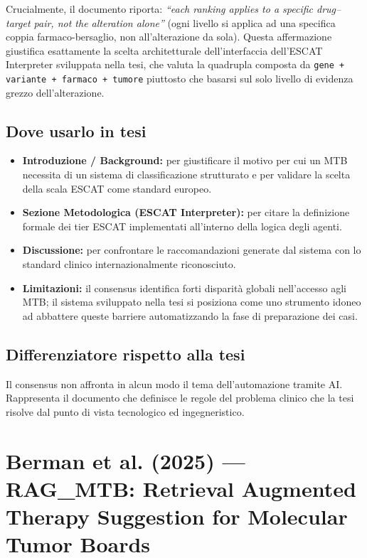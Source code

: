 \documentclass[12pt, a4paper]{article}
\begin{document}
Crucialmente, il documento riporta: \textit{``each ranking applies to a specific drug--target pair, not the alteration alone''} (ogni livello si applica ad una specifica coppia farmaco-bersaglio, non all'alterazione da sola). Questa affermazione giustifica esattamente la scelta architetturale dell'interfaccia dell'ESCAT Interpreter sviluppata nella tesi, che valuta la quadrupla composta da \texttt{gene + variante + farmaco + tumore} piuttosto che basarsi sul solo livello di evidenza grezzo dell'alterazione.

\subsection{Dove usarlo in tesi}
\begin{itemize}[leftmargin=1.8em, itemsep=2pt]
  \item \textbf{Introduzione / Background:} per giustificare il motivo per cui un MTB necessita di un sistema di classificazione strutturato e per validare la scelta della scala ESCAT come standard europeo.
  \item \textbf{Sezione Metodologica (ESCAT Interpreter):} per citare la definizione formale dei tier ESCAT implementati all'interno della logica degli agenti.
  \item \textbf{Discussione:} per confrontare le raccomandazioni generate dal sistema con lo standard clinico internazionalmente riconosciuto.
  \item \textbf{Limitazioni:} il consensus identifica forti disparità globali nell'accesso agli MTB; il sistema sviluppato nella tesi si posiziona come uno strumento idoneo ad abbattere queste barriere automatizzando la fase di preparazione dei casi.
\end{itemize}

\subsection{Differenziatore rispetto alla tesi}
Il consensus non affronta in alcun modo il tema dell'automazione tramite AI. Rappresenta il documento che definisce le regole del problema clinico che la tesi risolve dal punto di vista tecnologico ed ingegneristico.

\newpage
\section{Berman et al. (2025) --- RAG\_MTB: Retrieval Augmented Therapy Suggestion for Molecular Tumor Boards}
\end{document}
